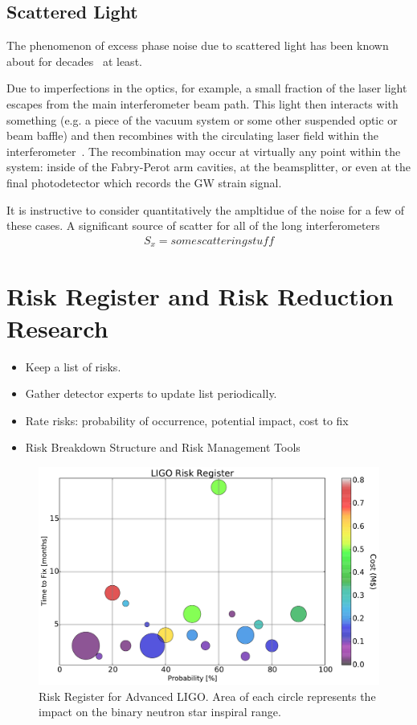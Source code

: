 \subsection{Scattered Light}
The phenomenon of excess phase noise due to scattered light has been known about for
decades~\cite{Schilling:1981} at least.

Due to imperfections in the optics, for example, a small fraction of the laser light escapes from
the main interferometer beam path. This light then interacts with something (e.g. a piece of the
vacuum system or some other suspended optic or beam baffle) and then recombines with the
circulating laser field within the
interferometer~\cite{Kip:Scatter95, Kip:scatter1989, Sam:Scatter2012, Stefano:Scatter, Vinet:scatter, fritschel1998high}.
The recombination may occur at virtually any point within the system: inside of the
Fabry-Perot arm cavities, at the beamsplitter, or even at the final photodetector which
records the GW strain signal.

It is instructive to consider quantitatively the ampltidue of the noise for a few of
these cases. A significant source of scatter for all of the long interferometers
\begin{align}
S_x = some scattering stuff
\end{align}


\section{Risk Register and Risk Reduction Research}

\begin{itemize}
  \item Keep a list of risks.
  \item Gather detector experts to update list periodically.
  \item Rate risks: probability of occurrence, potential impact, cost to fix
  \item Risk Breakdown Structure and Risk Management Tools
\end{itemize}

\begin{figure}[h]
\centering
\includegraphics[width=\columnwidth]{Figures/Risk.pdf}
\caption{Risk Register for Advanced LIGO. Area of each circle represents the impact on the binary neutron star inspiral range.}
\label{fig:RiskBubbles}
\end{figure}


